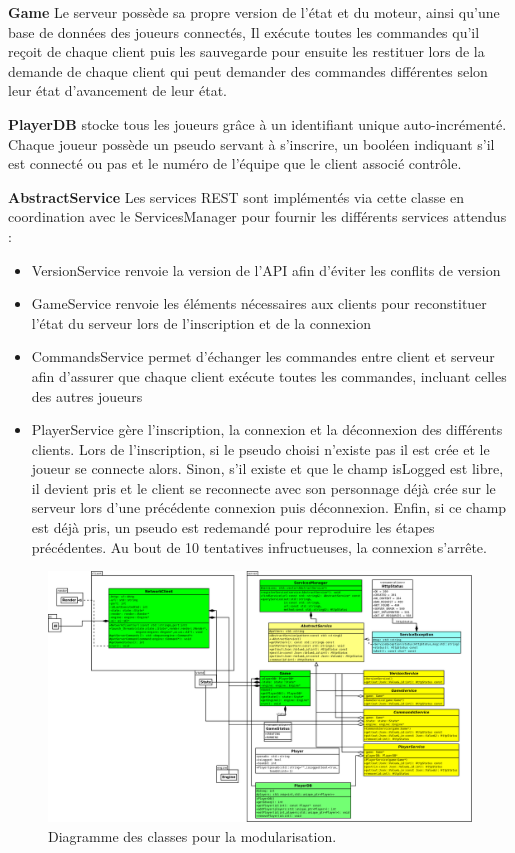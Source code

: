 \documentclass[a4paper,12pt]{article}
\begin{document}
\textbf{Game} Le serveur possède sa propre version de l'état et du moteur, ainsi qu'une base de données des joueurs connectés, Il exécute toutes les commandes qu'il reçoit de chaque client puis les sauvegarde pour ensuite les restituer lors de la demande de chaque client qui peut demander des commandes différentes selon leur état d'avancement de leur état.

\textbf{PlayerDB} stocke tous les joueurs grâce à un identifiant unique auto-incrémenté. Chaque joueur possède un pseudo servant à s'inscrire, un booléen indiquant s'il est connecté ou pas et le numéro de l'équipe que le client associé contrôle.

\textbf{AbstractService} Les services REST sont implémentés via cette classe en coordination avec le ServicesManager pour fournir les différents services attendus : 
\begin{itemize}
\item VersionService renvoie la version de l'API afin d'éviter les conflits de version
\item GameService renvoie les éléments nécessaires aux clients pour reconstituer l'état du serveur lors de l'inscription et de la connexion
\item CommandsService permet d'échanger les commandes entre client et serveur afin d'assurer que chaque client exécute toutes les commandes, incluant celles des autres joueurs
\item PlayerService gère l'inscription, la connexion et la déconnexion des différents clients. Lors de l'inscription, si le pseudo choisi n'existe pas il est crée et le joueur se connecte alors. Sinon, s'il existe et que le champ isLogged est libre, il devient pris et le client se reconnecte avec son personnage déjà crée sur le serveur lors d'une précédente connexion puis déconnexion. Enfin, si ce champ est déjà pris, un pseudo est redemandé pour reproduire les étapes précédentes. Au bout de 10 tentatives infructueuses, la connexion s'arrête.
\end{itemize}

\begin{landscape}
    \begin{figure}[p]
        \centering
        \includegraphics[width=0.9\paperheight,keepaspectratio]{module.png}
        \caption{\label{uml:module}Diagramme des classes pour la modularisation.}
    \end{figure}
\end{landscape}
\end{document}
